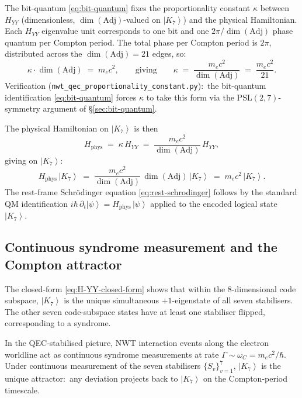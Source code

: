 \documentclass[11pt]{article}
\newcommand{\Adj}{\mathrm{Adj}}
\newcommand{\ket}[1]{\left|#1\right\rangle}
\newcommand{\PSL}{\mathrm{PSL}}
\begin{document}
The bit-quantum \eqref{eq:bit-quantum} fixes the proportionality
constant $\kappa$ between $H_{YY}$ (dimensionless, $\dim(\Adj)$-valued
on $\ket{K_7}$) and the physical Hamiltonian.  Each $H_{YY}$
eigenvalue unit corresponds to one bit and one $2\pi/\dim(\Adj)$
phase quantum per Compton period.  The total phase per Compton
period is $2\pi$, distributed across the $\dim(\Adj) = 21$ edges,
so:
\begin{equation}
  \kappa \cdot \dim(\Adj) \;=\; m_e c^2,
  \qquad\text{giving}\qquad
  \kappa \;=\; \frac{m_e c^2}{\dim(\Adj)} \;=\; \frac{m_e c^2}{21}.
  \label{eq:kappa-formula}
\end{equation}
Verification (\texttt{nwt\_qec\_proportionality\_constant.py}):\
the bit-quantum identification \eqref{eq:bit-quantum} forces
$\kappa$ to take this form via the $\PSL(2,7)$-symmetry argument of
\S\ref{sec:bit-quantum}.

The physical Hamiltonian on $\ket{K_7}$ is then
\begin{equation}
  H_{\text{phys}}\;=\;\kappa\, H_{YY}
  \;=\;\frac{m_e c^2}{\dim(\Adj)}\, H_{YY},
  \label{eq:H-phys}
\end{equation}
giving on $\ket{K_7}$:
\begin{equation}
  H_{\text{phys}}\, \ket{K_7}
  \;=\;
  \frac{m_e c^2}{\dim(\Adj)}\, \dim(\Adj)\, \ket{K_7}
  \;=\;
  m_e c^2\, \ket{K_7}.
\end{equation}
The rest-frame Schr\"odinger equation \eqref{eq:rest-schrodinger}
follows by the standard QM identification
$i\hbar\, \partial_t \ket{\psi} = H_{\text{phys}}\, \ket{\psi}$
applied to the encoded logical state $\ket{K_7}$.

\subsection{Continuous syndrome measurement and the Compton attractor}
\label{sec:syndrome-attractor}

The closed-form \eqref{eq:H-YY-closed-form} shows that within the
$8$-dimensional code subspace, $\ket{K_7}$ is the unique simultaneous
$+1$-eigenstate of all seven stabilisers.  The other seven code-subspace
states have at least one stabiliser flipped, corresponding to a
syndrome.

In the QEC-stabilised picture, NWT interaction events along the
electron worldline act as continuous syndrome measurements at rate
$\Gamma \sim \omega_C = m_e c^2/\hbar$.  Under continuous measurement
of the seven stabilisers $\{S_v\}_{v=1}^{7}$, $\ket{K_7}$ is the unique
attractor:\ any deviation projects back to $\ket{K_7}$ on the
Compton-period timescale.
\end{document}
